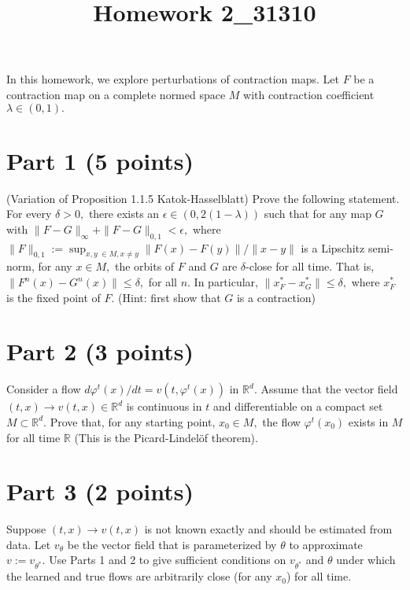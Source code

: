 \documentclass[12pt]{article}
\title{Homework 2_31310}
\begin{document}
\MakeScribeTop

In this homework, we explore perturbations of contraction maps.
Let $F$ be a contraction map on a complete normed space $M$ with contraction coefficient 
$\lambda \in (0,1).$

\section*{Part 1 (5 points)}
(Variation of Proposition 1.1.5 Katok-Hasselblatt) 
Prove the following statement. For every $\delta > 0,$ there exists an $\epsilon \in (0, 2(1-\lambda))$ such that for any map $G$ with $\|F - G\|_\infty + \|F - G\|_{0,1} < \epsilon,$ where 
$\|F\|_{0,1} := \sup_{x, y \; \in M, x \neq y} \|F(x) - F(y)\|/\|x - y\|$ is a Lipschitz semi-norm, for any $x \in M,$ the orbits of $F$ and $G$ are $\delta$-close for all time.
That is, $\|F^n(x) - G^n(x)\| \leq \delta,$ for all $n.$ In particular, 
$\|x^*_F - x^*_G \|\leq \delta,$ where $x^*_F$ is the fixed point of $F.$ 
(Hint: first show that $G$ is a contraction)


\section*{Part 2 (3 points)}
Consider a flow $d\varphi^t(x)/dt = v(t, \varphi^t(x))$ in $\mathbb{R}^d.$ Assume that the vector field $(t, x) \to v(t,x) \in \mathbb{R}^d$ is continuous in $t$ and differentiable on 
 a compact set $M \subset \mathbb{R}^d.$ Prove that, for any starting point, $x_0 \in M,$ the flow $\varphi^t(x_0)$ exists in 
 $M$ for all time $\mathbb{R}$ (This is the Picard-Lindel\"of theorem).

\section*{Part 3 (2 points)}
Suppose $(t, x) \to v(t, x)$ is not known exactly and should be estimated from data. Let $v_\theta$ be the vector field that is parameterized by $\theta$ to 
approximate $v := v_{\theta^*}.$ Use Parts 1 and 2 to give sufficient conditions on $v_{\theta^*}$ and $\theta$ under which the learned and true flows are arbitrarily close (for any $x_0$) for all time. 
\end{document}
